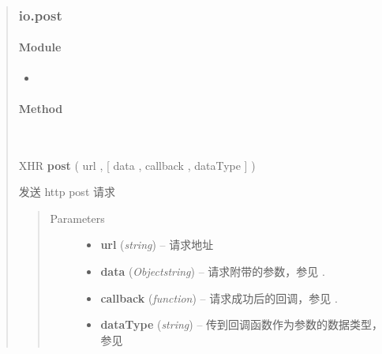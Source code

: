 \documentclass[letterpaper,10pt,english]{sphinxmanual}
\begin{document}
\begin{quote}
\subsubsection{io.post}
\label{api/core/ajax/post:io-post}\label{api/core/ajax/post::doc}

\paragraph{Module}
\label{api/core/ajax/post:module}\begin{itemize}
\item {}
{\hyperref[api/core/ajax/index:module-io]{}}

\end{itemize}


\paragraph{Method}
\label{api/core/ajax/post:method}

\begin{fulllineitems}
\label{api/core/ajax/post:io.post}~
\begin{DUlineblock}{0em}
\item[] XHR \textbf{post} ( url , {[} data , callback , dataType {]} )
\item[] 发送 http post 请求
\end{DUlineblock}
\begin{quote}\begin{description}
\item[{Parameters}] \leavevmode\begin{itemize}
\item {}
\textbf{url} (\emph{string}) -- 请求地址

\item {}
\textbf{data} (\emph{Object\textbar{}string}) -- 请求附带的参数，参见 {\hyperref[api/core/ajax/io:io.cfg.data]{}} .

\item {}
\textbf{callback} (\emph{function}) -- 请求成功后的回调，参见 {\hyperref[api/core/ajax/io:io.cfg.success]{}} .

\item {}
\textbf{dataType} (\emph{string}) -- 传到回调函数作为参数的数据类型，参见 {\hyperref[api/core/ajax/io:io.cfg.dataType]{}}

\end{itemize}


\end{description}
\end{quote}
\end{fulllineitems}
\end{quote}
\end{document}
